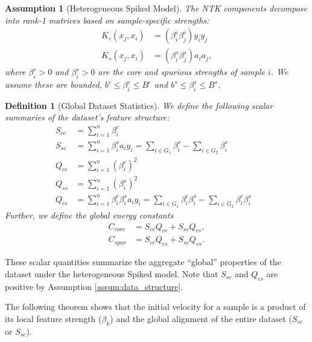 \documentclass[letter,11pt]{article}
\newtheorem{definition}{Definition}
\newtheorem{assumption}{Assumption}
\begin{document}
\begin{assumption}[Heterogeneous Spiked Model]\label{assum:het_spike}
    The NTK components decompose into rank-1 matrices based on sample-specific strengths:
    \begin{equation}
    \begin{aligned}
    K_c(x_j, x_i) &= (\beta^c_i \beta^c_j) y_i y_j \\
    K_s(x_j, x_i) &= (\beta^s_i \beta^s_j) a_i a_j,
    \end{aligned}
    \end{equation}
    where $\beta^c_i > 0$ and $\beta^s_i > 0$ are the core and spurious strengths of sample $i$. We assume these are bounded, $b^c \le \beta^c_i \le B^c$ and $b^s \le \beta^s_i \le B^s$.
\end{assumption}
\begin{definition}[Global Dataset Statistics]\label{def:global_stats}
    We define the following scalar summaries of the dataset's feature structure:
    \begin{align}
        S_{cc} &= \sum_{i=1}^n \beta^c_i &  \\ 
        S_{sc} &= \sum_{i=1}^n \beta^s_i a_i y_i = \sum_{i \in G_1} \beta^s_i - \sum_{i \in G_2} \beta^s_i &  \\
        Q_{cc} &= \sum_{i=1}^n (\beta^c_i)^2  \\
        Q_{ss} &= \sum_{i=1}^n (\beta^s_i)^2 \\
        Q_{cs} &= \sum_{i=1}^n \beta^c_i \beta^s_i a_i y_i = \sum_{i \in G_1} \beta^c_i \beta^s_i - \sum_{i \in G_2} \beta^c_i \beta^s_i
    \end{align}
    Further, we define the global energy constants
    \begin{equation}
    \begin{aligned}
    C_{core} &= S_{cc} Q_{cc} + S_{sc} Q_{cs}, \\
    C_{spur} &= S_{cc} Q_{cs} + S_{sc} Q_{ss}.
    \end{aligned}
    \end{equation}
\end{definition}
These scalar quantities summarize the aggregate ``global'' properties of the dataset under the heterogeneous Spiked model. Note that $S_{sc}$ and $Q_{cs}$ are positive by Assumption \ref{assum:data_structure}.

The following theorem shows that the initial velocity for a sample is a product of its {local} feature strength ($\beta_k$) and the {global} alignment of the entire dataset ($S_{cc}$ or $S_{sc}$).
\end{document}
